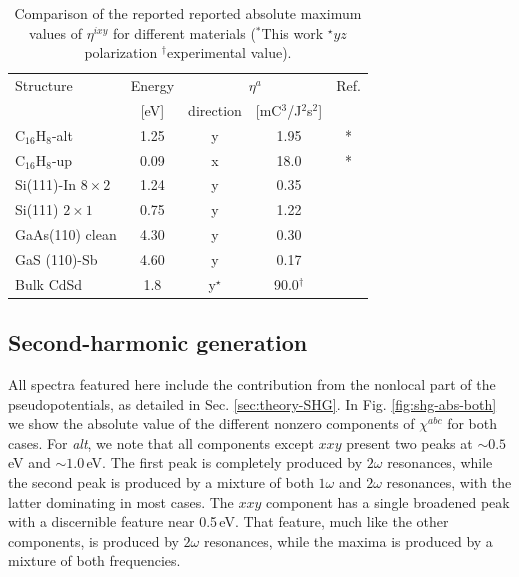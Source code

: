 \documentclass[pss]{wiley2sp} %
\begin{document}
\begin{table}%
  \sidecaption
  \begin{tabular}{lcccc}
  \hline
    Structure & Energy &  \multicolumn{2}{c}{$\eta^{a}$} &  Ref.\\
    \cline{3-4}
              & [eV]   & direction & [mC$^{3}$/J$^{2}$s$^{2}$] \\
    \hline
    C$_{16}$H$_{8}$-alt     & 1.25  & y & 1.95  & *     \\
    C$_{16}$H$_{8}$-up      & 0.09  & x & 18.0  & *     \\
    Si(111)-In $8\times2$   & 1.24  & y & 0.35  & \cite{arzate2014optical}  \\
    Si(111) $2\times1$      & 0.75  & y & 1.22  & \cite{mendoza2012optical} \\
    GaAs(110) clean         & 4.30  & y & 0.30  & \cite{nastos2007full}     \\
    GaS (110)-Sb            & 4.60  & y & 0.17  & \cite{cabellos2011optical}\\
    Bulk CdSd               & 1.8   & y$^{\star}$ & 90.0$^{\dag}$  & \cite{nastos2006optical}  \\
  \hline
  \end{tabular}
  \caption[]{%
  Comparison of the reported reported absolute maximum values of {$\eta^{ixy}$} for different materials ($^{*}$This work $^{\star}yz$ polarization $^{\dag}$experimental value).}
  \label{tab:etacomp}
\end{table}

\subsection{Second-harmonic generation}
All spectra featured here include the contribution from the nonlocal part of
the pseudopotentials, as detailed in Sec. \ref{sec:theory-SHG}. In Fig.
\ref{fig:shg-abs-both} we show the absolute value of the different nonzero
components of $\chi^{abc}$ for both cases. For \emph{alt}, we note that all
components except $xxy$ present two peaks at $\sim0.5$\,eV and $\sim1.0$\,eV.
The first peak is completely produced by $2\omega$ resonances, while the
second peak is produced by a mixture of both $1\omega$ and $2\omega$
resonances, with the latter dominating in most cases. The $xxy$ component has
a single broadened peak with a discernible feature near 0.5\,eV. That feature,
much like the other components, is produced by $2\omega$ resonances, while the
maxima is produced by a mixture of both frequencies.
\end{document}
